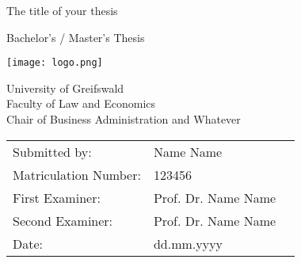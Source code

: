 \begin{titlepage}

\begin{center}
        
\Huge
        
The title of your thesis
        
\vspace{2cm}
        
\LARGE
        
Bachelor's / Master's Thesis
        
\vspace{1cm}
       
\texttt{[image: logo.png]} 
        
\vspace{1cm}
    
\large
        
University of Greifswald\\
Faculty of Law and Economics \\
Chair of Business Administration and Whatever\\
        
\vfill
        
\normalsize
        
\begin{flushleft}
	\begin{tabular}{llc}
	    Submitted by: &Name Name& \\
		Matriculation Number:& 123456& \\
		First Examiner: & Prof. Dr. Name Name& \\
		Second Examiner: & Prof. Dr. Name Name& \\
		Date: &dd.mm.yyyy&
	\end{tabular}
\end{flushleft}
        
\end{center}

\end{titlepage}
